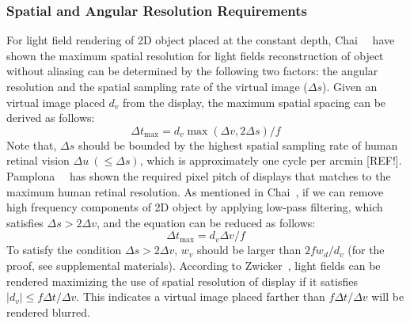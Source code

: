 \subsubsection{Spatial and Angular Resolution Requirements}
For light field rendering of 2D object placed at the constant depth, Chai~\etal~\cite{chai00} have shown the maximum spatial resolution for light fields reconstruction of object without aliasing can be determined by the following two factors: the angular resolution and the spatial sampling rate of the virtual image ($\Delta s$). Given an virtual image placed $d_v$ from the display, the maximum spatial spacing can be derived as follows:
\begin{equation}
\Delta t_{\max} = d_v \max( \Delta v, 2\Delta s )/f
\end{equation}
Note that, $\Delta s$ should be bounded by the highest spatial sampling rate of human retinal vision $\Delta u~(\leq \Delta s)$, which is approximately one cycle per arcmin [REF!]. Pamplona~\etal~\cite{pamplona12} has shown the required pixel pitch of displays that matches to the maximum human retinal resolution. As mentioned in Chai~\etal, if we can remove high frequency components of 2D object by applying low-pass filtering, which satisfies $\Delta s > 2\Delta v$, and the equation can be reduced as follows:
\begin{equation}
\Delta t_{\max} = d_v \Delta v/f 
\label{eq:resolutionLimits}
\end{equation}
To satisfy the condition $\Delta s > 2\Delta v$, $w_v$ should be larger than $2fw_d/d_v$ (for the proof, see supplemental materials). According to Zwicker~\etal, light fields can be rendered maximizing the use of spatial resolution of display if it satisfies $|d_v| \leq f\Delta t/\Delta v$. This indicates a virtual image placed farther than $f\Delta t/\Delta v$ will be rendered blurred.

